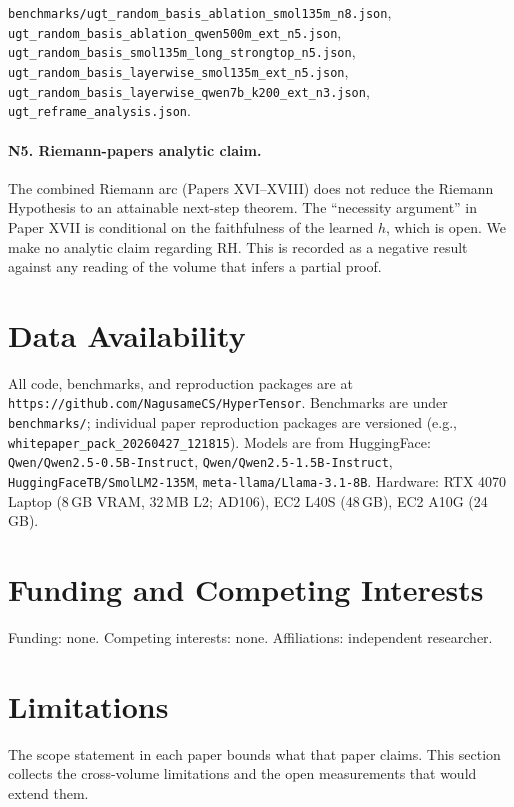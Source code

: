 \documentclass[11pt]{article}
\begin{document}
\texttt{benchmarks/ugt\_random\_basis\_ablation\_smol135m\_n8.json}, \texttt{ugt\_random\_basis\_ablation\_qwen500m\_ext\_n5.json}, \texttt{ugt\_random\_basis\_smol135m\_long\_strongtop\_n5.json}, \texttt{ugt\_random\_basis\_layerwise\_smol135m\_ext\_n5.json}, \texttt{ugt\_random\_basis\_layerwise\_qwen7b\_k200\_ext\_n3.json}, \texttt{ugt\_reframe\_analysis.json}.

\paragraph{N5. Riemann-papers analytic claim.} The combined Riemann arc (Papers XVI--XVIII) does not reduce the Riemann Hypothesis to an attainable next-step theorem. The ``necessity argument'' in Paper XVII is conditional on the faithfulness of the learned $h$, which is open. We make no analytic claim regarding RH. This is recorded as a negative result against any reading of the volume that infers a partial proof.

\section*{Data Availability}
All code, benchmarks, and reproduction packages are at \texttt{https://github.com/NagusameCS/HyperTensor}. Benchmarks are under \texttt{benchmarks/}; individual paper reproduction packages are versioned (e.g., \texttt{whitepaper\_pack\_20260427\_121815}). Models are from HuggingFace: \texttt{Qwen/Qwen2.5-0.5B-Instruct}, \texttt{Qwen/Qwen2.5-1.5B-Instruct}, \texttt{HuggingFaceTB/SmolLM2-135M}, \texttt{meta-llama/Llama-3.1-8B}. Hardware: RTX 4070 Laptop (8\,GB VRAM, 32\,MB L2; AD106), EC2 L40S (48\,GB), EC2 A10G (24\,GB).

\section*{Funding and Competing Interests}
Funding: none. Competing interests: none. Affiliations: independent researcher.


\section*{Limitations}

The scope statement in each paper bounds what that paper claims.
This section collects the cross-volume limitations and the open
measurements that would extend them.
\end{document}
